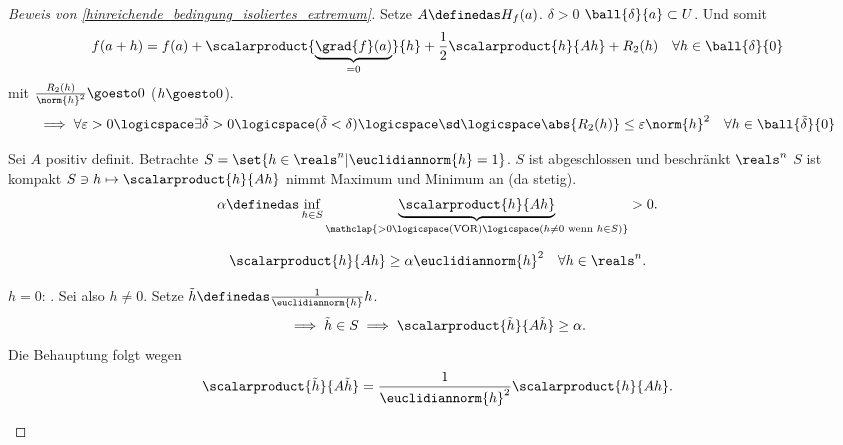 \begin{proof}[Beweis von \ref{hinreichende_bedingung_isoliertes_extremum}]
  Setze \( A\definedas H_f(a) \). \texists \( \delta>0 \) \sd \( \ball{\delta}{a}\subset U \). Und somit
  \begin{equation*}
    f(a+h)=f(a)+\scalarproduct{\underbrace{\grad{f}(a)}_{=0}}{h}+\frac{1}{2}\scalarproduct{h}{Ah}+R_2(h)\quad \forall h\in \ball{\delta}{0}
  \end{equation*}
  mit \( \frac{R_2(h)}{\norm{h}^2}\goesto 0 \) (\( h\goesto 0 \)).
  \begin{equation*}
    \implies \forall \varepsilon>0 \logicspace \exists \tilde{\delta}>0\logicspace (\tilde{\delta}<\delta) \logicspace \text{\sd} \logicspace \abs{R_2(h)}\leq \varepsilon \norm{h}^2\quad \forall h\in \ball{\tilde{\delta}}{0}
  \end{equation*}
  \begin{proofdescription}
    \item[\ref{hinreichende_bedingung_isoliertes_minimum}] Sei \( A \) positiv definit. Betrachte \( S=\set{h\in \reals^n|\euclidiannorm{h}=1} \). \( S \) ist abgeschlossen und beschränkt \tsubset \( \reals^n \) \timplies \( S \) ist kompakt \timplies \( S\ni h\mapsto \scalarproduct{h}{Ah} \) nimmt Maximum und Minimum an (da stetig).
    \begin{equation*}
      \alpha\definedas \inf_{h\in S}\underbrace{\scalarproduct{h}{Ah}}_{\mathclap{>0\logicspace  (\text{VOR})\logicspace (h\neq 0 \text{ wenn }h\in S)}}>0.
    \end{equation*}
    \begin{behauptung*}
      \begin{equation*}
        \scalarproduct{h}{Ah}\geq \alpha\euclidiannorm{h}^2 \quad \forall h\in \reals^n.
      \end{equation*}
    \end{behauptung*}
    \begin{subproof}
      \( h=0\): \checkmark. Sei also \( h\neq 0 \). Setze \( \tilde{h}\definedas\frac{1}{\euclidiannorm{h}}h \).  
      \begin{equation*}
        \implies \tilde{h}\in S\implies \scalarproduct{\tilde{h}}{A\tilde{h}}\geq \alpha.
      \end{equation*}
      Die Behauptung folgt wegen
      \begin{equation*}
        \scalarproduct{\tilde{h}}{A\tilde{h}}=\frac{1}{\euclidiannorm{h}^2}\scalarproduct{h}{Ah}.
      \end{equation*}
    \end{subproof}

\end{proofdescription}
\end{proof}

